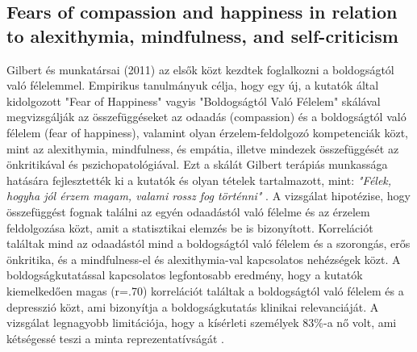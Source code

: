 \subsection*{Fears of compassion and happiness in relation
	to alexithymia, mindfulness, and self-criticism \cite{gilbert_mcewan_gibbons_chotai_duarte_matos_2011}}
Gilbert és munkatársai (2011) az elsők közt kezdtek foglalkozni a boldogságtól való félelemmel. Empirikus tanulmányuk célja, hogy egy új, a kutatók által kidolgozott "Fear of Happiness" vagyis "Boldogságtól Való Félelem" skálával \cite{gilbert_mcewan_gibbons_chotai_duarte_matos_2011} megvizsgálják az összefüggéseket az odaadás (compassion) és a boldogságtól való félelem (fear of happiness), valamint olyan érzelem-feldolgozó kompetenciák közt, mint az  alexithymia, mindfulness, és empátia, illetve mindezek összefüggését az önkritikával és pszichopatológiával. Ezt a skálát Gilbert terápiás munkassága hatására fejlesztették ki a kutatók és olyan tételek tartalmazott, mint: \textit{"Félek, hogyha jól érzem magam, valami rossz fog történni"} \cite[o. 381]{gilbert_mcewan_gibbons_chotai_duarte_matos_2011}. A vizsgálat hipotézise, hogy összefüggést fognak találni az egyén odaadástól való félelme és az érzelem feldolgozása közt, amit a statisztikai elemzés be is bizonyított. Korrelációt találtak mind az odaadástól mind a boldogságtól való félelem és a szorongás, erős önkritika, és a mindfulness-el és alexithymia-val kapcsolatos nehézségek közt. A boldogságkutatással kapcsolatos legfontosabb eredmény, hogy a kutatók kiemelkedően magas (r=.70) korrelációt találtak a boldogságtól való félelem és a depresszió közt, ami bizonyítja a boldogságkutatás klinikai relevanciáját. A vizsgálat legnagyobb limitációja, hogy a kísérleti személyek 83\%-a nő volt, ami kétségessé teszi a minta reprezentatívságát \cite{gilbert_mcewan_gibbons_chotai_duarte_matos_2011}.

